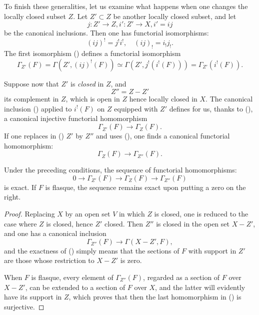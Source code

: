 To finish these generalities, let us examine what happens when one
changes the locally closed subset $Z$. Let $Z'\subset Z$ be another
locally closed subset, and let
\[
j\colon Z' \to Z, i'\colon Z' \to X, i'=ij
\]
be the canonical inclusions. Then one has functorial isomorphisms:
\begin{equation} \label{eq:I.13} {(ij)^!=j^!i^!, \quad (ij)_!=i_!j_!}.
\end{equation}
The first isomorphism () defines a functorial isomorphism
\begin{equation} \label{eq:I.14} {\Gamma_{Z'}(F)=\Gamma(Z', (ij)^!(F))\simeq \Gamma(Z', j^!(i^!(F)))=\Gamma_{Z'}(i^!(F))}.
\end{equation}

Suppose now that $Z'$ is \textit{closed} in $Z$, and
\[
Z''=Z-Z'
\]
its complement in $Z$, which is open in $Z$ hence locally closed in
$X$. The canonical inclusion () applied to $i^!(F)$ on
$Z$ equipped with $Z'$ defines for us, thanks to (), a
canonical injective functorial homomorphism
\begin{equation} \label{eq:I.15} {\Gamma_{Z'}(F) \to \Gamma_Z(F)}.
\end{equation}
If one replaces in () $Z'$ by $Z''$ and uses
(), one finds a canonical functorial homomorphism:
\begin{equation*} \label{eq:I.15'} \tag{$15'$} {\Gamma_Z(F) \to \Gamma_{Z''}(F)}.
\end{equation*}

\begin{proposition} \label{I.1.8}
Under the preceding conditions, the sequence of functorial
homomorphisms:
\begin{equation} \label{eq:I.16} {0 \to \Gamma_{Z'}(F) \to \Gamma_Z(F) \to \Gamma_{Z''}(F)}
\end{equation}
is exact. If $F$ is flasque, the sequence remains exact upon putting a
zero on the right.
\end{proposition}

\begin{proof}
Replacing $X$ by an open set $V$ in which $Z$ is closed, one is
reduced to the case where $Z$ is closed, hence $Z'$ closed. Then
$Z''$ is closed in the open set $X-Z'$, and one has a canonical
inclusion
\[
\Gamma_{Z''}(F) \to \Gamma(X-Z', F),
\]
and the exactness of () simply means that the sections of
$F$ with support in $Z'$ are those whose restriction to $X-Z'$ is
zero.

When $F$ is flasque, every element of $\Gamma_{Z''}(F)$, regarded as a
section of $F$ over $X-Z'$, can be extended to a section of $F$ over
$X$, and the latter will evidently have its support in $Z$, which
proves that then the last homomorphism in () is
surjective.
\skipqed
\end{proof}

